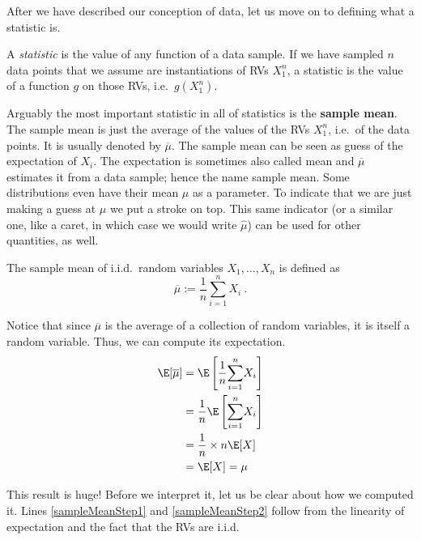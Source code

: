 After we have described our conception of data, let us move on to defining what a statistic is.

\begin{Definition}
A \emph{statistic} is the value of any function of a data sample. If we have sampled $ n $ data points that we assume are instantiations of RVs
$ X_{1}^{n} $, a statistic is the value of a function $ g $ on those RVs, i.e.\ $ g(X_{1}^{n}) $.
\end{Definition}

Arguably the most important statistic in all of statistics is the \textbf{sample mean}. The sample mean is just the average of the
values of the RVs $ X_{1}^{n} $, i.e.\ of the data points. It is usually denoted by $ \overline{\mu} $. The
sample mean can be seen as guess of the expectation of $ X_{i} $. The expectation is sometimes also
called mean and $ \overline{\mu} $ estimates it from a data sample; hence the name sample mean. Some distributions even have their
mean $ \mu $ as a parameter. To indicate that we are just making a guess at $ \mu $ we put a stroke on top.
This same indicator (or a similar one, like a caret, in which case we would write $ \hat{\mu} $) can be used for other quantities, as well.

\begin{Definition}
The sample mean of i.i.d.\ random variables $ X_{1}, \ldots, X_{n} $ is defined as 
$$ \overline{\mu} := \dfrac{1}{n}\underset{i=1}{\overset{n}{\sum}} X_{i} \ . $$
\end{Definition}

Notice that since $ \overline{\mu} $ is the average of a collection of random variables, it is itself a random variable. Thus, we can
compute its expectation.
\begin{align}
\E[\overline{\mu}] &= \E\left[\dfrac{1}{n} \underset{i=1}{\overset{n}{\sum}} X_{i}\right] \label{eq:sampleMeanBegin} \\
&= \dfrac{1}{n} \E\left[\underset{i=1}{\overset{n}{\sum}} X_{i}\right] \label{sampleMeanStep1} \\
&= \dfrac{1}{n} \times n \E[X] \label{sampleMeanStep2} \\
&= \E[X] = \mu \label{eq:sampleMeanEnd}
\end{align}

This result is huge! Before we interpret it, let us be clear about how we computed it.  Lines \eqref{sampleMeanStep1} and
\eqref{sampleMeanStep2} follow from the linearity of expectation and the fact that the RVs are i.i.d. 

